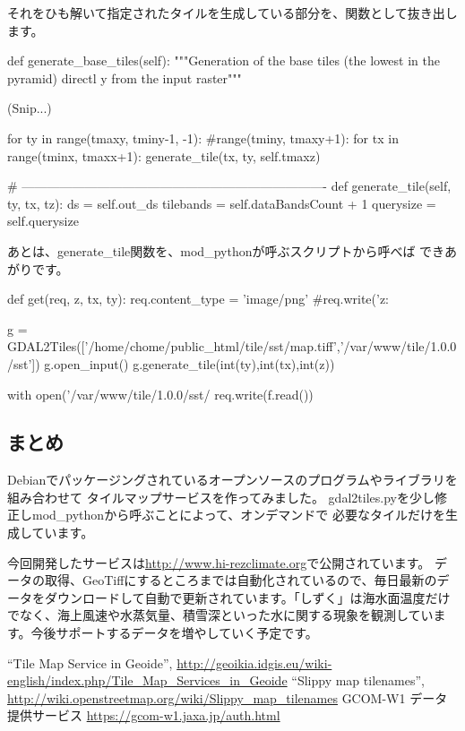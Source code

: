 \documentclass[mingoth,a4paper]{jsarticle}
\begin{document}
それをひも解いて指定されたタイルを生成している部分を、関数として抜き出します。
\begin{commandline}
     def generate_base_tiles(self):
         """Generation of the base tiles (the lowest in the pyramid) directl y from the input raster"""

                               (Snip...)

         for ty in range(tmaxy, tminy-1, -1): #range(tminy, tmaxy+1):
             for tx in range(tminx, tmaxx+1):
                 generate_tile(tx, ty, self.tmaxz)

     # -------------------------------------------------------------------------
     def generate_tile(self, ty, tx, tz):
         ds = self.out_ds
         tilebands = self.dataBandsCount + 1
         querysize = self.querysize
\end{commandline}

あとは、generate\_tile関数を、mod\_pythonが呼ぶスクリプトから呼べば
できあがりです。
\begin{commandline}
def get(req, z, tx, ty):
        req.content_type = 'image/png'
        #req.write('z: %

        g = GDAL2Tiles(['/home/chome/public_html/tile/sst/map.tiff','/var/www/tile/1.0.0/sst'])
        g.open_input()
        g.generate_tile(int(ty),int(tx),int(z))

        with open('/var/www/tile/1.0.0/sst/%
                req.write(f.read())
\end{commandline}

\subsection{まとめ}
Debianでパッケージングされているオープンソースのプログラムやライブラリを組み合わせて
タイルマップサービスを作ってみました。
gdal2tiles.pyを少し修正しmod\_pythonから呼ぶことによって、オンデマンドで
必要なタイルだけを生成しています。

今回開発したサービスは\url{http://www.hi-rezclimate.org}で公開されています。
データの取得、GeoTiffにするところまでは自動化されているので、毎日最新のデータをダウンロードして自動で更新されています。「しずく」は海水面温度だけでなく、海上風速や水蒸気量、積雪深といった水に関する現象を観測しています。今後サポートするデータを増やしていく予定です。



\begin{thebibliography}{9}
``Tile Map Service in Geoide'', \url{http://geoikia.idgis.eu/wiki-english/index.php/Tile\_Map\_Services\_in\_Geoide}
 ``Slippy map tilenames'', \url{http://wiki.openstreetmap.org/wiki/Slippy\_map\_tilenames}
 GCOM-W1 データ提供サービス \url{https://gcom-w1.jaxa.jp/auth.html}
\end{thebibliography}
\end{document}
